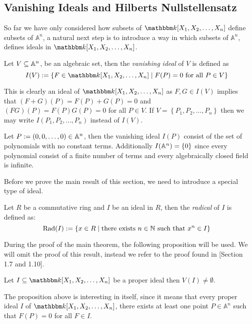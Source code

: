 \subsection{Vanishing Ideals and Hilberts Nullstellensatz}\label{subsec:hilbert_nullstellenzats}
So far we have only considered how subsets of $\K[X_1, X_2, \ldots, X_{n}]$ define subsets of $\mathbb{A}^{n}$, a natural next step is to introduce a way in which subsets of $\mathbb{A}^{n}$, defines ideals in $\K[X_1, X_2, \ldots, X_{n}]$.
\begin{definition}\label{def:affine_vanishing_deal}
  Let $V \subseteq \mathbb{A}^n$, be an algebraic set, then the \textit{vanishing ideal} of $V$ is defined as
  \begin{equation*}
    I(V) := \{F \in \pols \;\vert\; F(P) = 0 \text{ for all } P \in V\}
  \end{equation*}
\end{definition}
This is clearly an ideal of $\K[X_1, X_2, \ldots, X_{n}]$ as $F, G \in  I(V)$ implies that $(F + G)(P) = F(P) + G(P) = 0$ and $(FG)(P) = F(P)G(P) = 0$ for all $P \in V$. If $V = \left\{P_1, P_2, \ldots, P_{n}\right\}$ then we may write $I(P_1, P_2, \ldots, P_{n})$ instead of $I(V)$.

\begin{example}\label{exmp:vanishing_ideal_of_zero}
  Let $P := (0, 0, \ldots, 0) \in \mathbb{A}^{n}$, then the vanishing ideal $I(P)$ consist of the set of polynomials with no constant terms. Additionally $I(\mathbb{A}^{n}) = \left\{0\right\}$ since every polynomial consist of a finite number of terms and every algebraically closed field is infinite.
\end{example}

Before we prove the main result of this section, we need to introduce a special type of ideal.
\begin{definition}
  Let $R$ be a commutative ring and $I$ be an ideal in $R$, then the \textit{radical} of $I$ is defined as:
  \begin{equation*}
    \textnormal{Rad}(I) := \left\{x \in R \mid \text{there exists } n \in \mathbb{N} \text{ such that } x^{n} \in I\right\}
  \end{equation*}
\end{definition}

During the proof of the main theorem, the following proposition will be used. We will omit the proof of this result, instead we refer to the proof found in \cite{Fulton}[Section 1.7 and 1.10].
\begin{proposition}\label{prop:weak_nullstellensatz}
  Let $I \subseteq \K[X_1, X_2, \ldots, X_{n}]$ be a proper ideal then $V(I) \neq \emptyset$.
\end{proposition}
The proposition above is interesting in itself, since it means that every proper ideal $I$ of $\K[X_1, X_2, \ldots, X_{n}]$, there exists at least one point $P \in \mathbb{A}^{n}$ such that $F(P) = 0$ for all $F \in I$.

